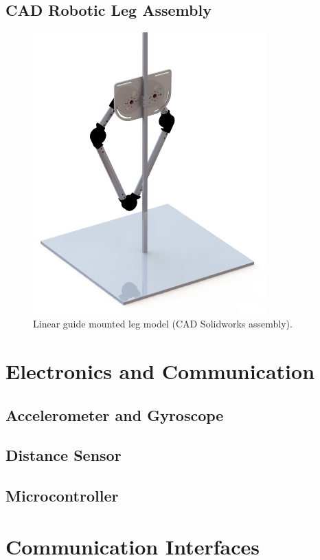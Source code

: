 \subsection{CAD Robotic Leg Assembly}
\begin{figure}
\centering
\includegraphics[width=0.8\textwidth]{images/mechanical/back-shot.png} 
\caption{Linear guide mounted leg model (CAD Solidworks assembly).}
\label{fig:Linear guide mounted leg model}
\end{figure}

\section{Electronics and Communication}
\subsection{Accelerometer and Gyroscope}
\subsection{Distance Sensor}
\subsection{Microcontroller}
\section{Communication Interfaces}
